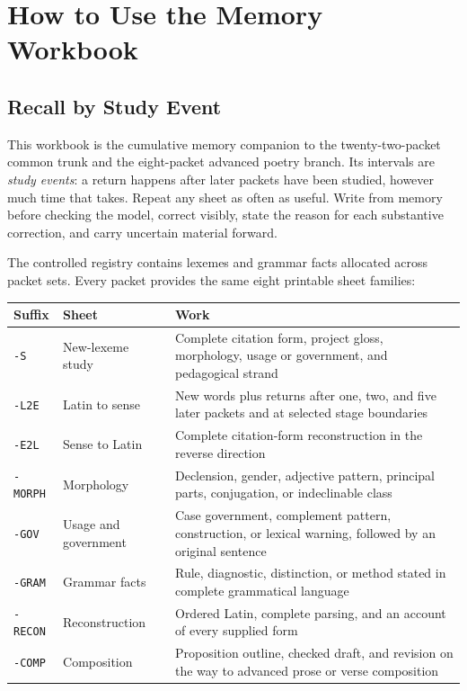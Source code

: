 \part{How to Use the Memory Workbook}

\chapter{Recall by Study Event}

This workbook is the cumulative memory companion to the twenty-two-packet
common trunk and the eight-packet advanced poetry branch. Its intervals are
\emph{study events}: a return happens after later packets have been studied,
however much time that takes. Repeat any sheet as often as useful. Write from
memory before checking the model, correct visibly, state the reason for each
substantive correction, and carry uncertain material forward.

The controlled registry contains  lexemes and
 grammar facts allocated across
 packet sets.  Every packet provides the same eight
printable sheet families:

\begin{xltabular}{\linewidth}{@{}P{1.2in}P{2.0in}Y@{}}
  \toprule
  \textbf{Suffix} & \textbf{Sheet} & \textbf{Work}\\
  \midrule
  \texttt{-S} & New-lexeme study & Complete citation form, project gloss,
    morphology, usage or government, and pedagogical strand\\
  \texttt{-L2E} & Latin to sense & New words plus returns after one, two, and
    five later packets and at selected stage boundaries\\
  \texttt{-E2L} & Sense to Latin & Complete citation-form reconstruction in
    the reverse direction\\
  \texttt{-MORPH} & Morphology & Declension, gender, adjective pattern,
    principal parts, conjugation, or indeclinable class\\
  \texttt{-GOV} & Usage and government & Case government, complement pattern,
    construction, or lexical warning, followed by an original sentence\\
  \texttt{-GRAM} & Grammar facts & Rule, diagnostic, distinction, or method
    stated in complete grammatical language\\
  \texttt{-RECON} & Reconstruction & Ordered Latin, complete parsing, and an
    account of every supplied form\\
  \texttt{-COMP} & Composition & Proposition outline, checked draft, and
    revision on the way to advanced prose or verse composition\\
  \bottomrule
\end{xltabular}

